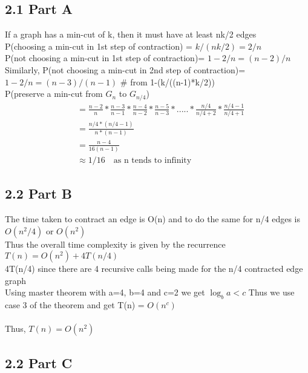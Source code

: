 \documentclass[12pt]{article}
\begin{document}
\subsection*{2.1 Part A} 

\vspace{10pt}

If a graph has a min-cut of k, then it must have at least nk/2 edges \\ 
P(choosing a min-cut in 1st step of contraction) = \(k/(nk/2)=2/n\) \\ 
P(not choosing a min-cut in 1st step of contraction)= \(1-2/n=(n-2)/n\) \\
Similarly, P(not choosing a min-cut in 2nd step of contraction)= \(1-2/n=(n-3)/(n-1)\) \# from 1-(k/((n-1)*k/2))\\
P(preserve a min-cut from \(G_n\) to \(G_{n/4}\)) \\ 
\begin{align*}
 &= \frac{n-2}{n} * \frac{n-3}{n-1} * \frac{n-4}{n-2} * \frac{n-5}{n-3} * ..... * \frac{n/4}{n/4+2} * \frac{n/4-1}{n/4+1}  \\
 &= \frac{n/4*(n/4-1)}{n*(n-1)} \\
 &= \frac{n-4}{16(n-1)} \\
 &\approx 1/16 \quad \text{as n tends to infinity}
\end{align*}

\subsection*{2.2 Part B} 

\vspace{10pt}
The time taken to contract an edge is O(n) and to do the same for n/4 edges is \(O(n^2/4)\) or \(O(n^2)\) \\
Thus the overall time complexity is given by the recurrence \\ 
\(T(n) = O(n^2) + 4T(n/4)\) \\ 
4T(n/4) since there are 4 recursive calls being made for the n/4 contracted edge graph  \\ 
Using master theorem with a=4, b=4 and c=2 we get \(\log_{b}a < c\) Thus we use case 3 of the theorem and get T(n) = \(O(n^c)\) \\~\\
Thus, \(T(n)=O(n^2)\) 

\subsection*{2.2 Part C} 
\end{document}
